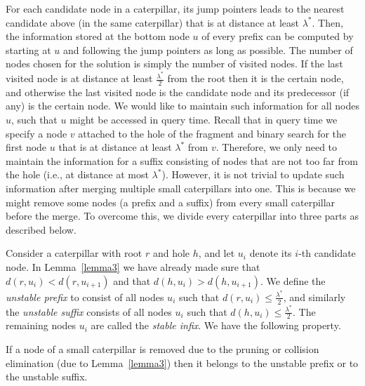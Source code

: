 \documentclass[a4paper,UKenglish]{lipics-v2016}
\theoremstyle{plain}
\begin{document}
\vspace{0.04in}  For each candidate node in a caterpillar, its jump pointers leads to the nearest
candidate above (in the same caterpillar) that is at distance at least $\lambda^{*}$. Then, the information
stored at the bottom node $u$ of every prefix can be computed by starting at $u$ and following
the jump pointers as long as possible. The number of nodes chosen for the solution is simply the number of visited
nodes. If the last visited node is at distance at least $\frac{\lambda^{*}}{2}$ from the root then it is
the certain node, and otherwise the last visited node is the candidate node and its predecessor
(if any) is the certain node. We would like to maintain such information for all nodes $u$,
such that $u$ might be accessed in query time. Recall that in query time we specify
a node $v$ attached to the hole of the fragment and binary search for the first node $u$ that
is at distance at least $\lambda^{*}$ from $v$. Therefore, we only need to maintain the information
for a suffix consisting of nodes that are not too far from the hole (i.e., at distance at most $\lambda^{*}$). However, it is not
 trivial to update such information after merging multiple small caterpillars into
one. This is because we might remove some nodes (a prefix and a suffix)
from every small caterpillar before the merge. To overcome this, we divide every caterpillar into
three parts as described below.

\vspace{0.04in}  
Consider a caterpillar with root $r$ and hole $h$, and let $u_{i}$ denote its $i$-th candidate node. In Lemma~\ref{lemma3} we have already made sure that $d(r,u_{i}) < d(r,u_{i+1})$
and that $d(h,u_{i}) > d(h,u_{i+1})$. We define the \emph{unstable prefix} to
consist of all nodes $u_{i}$ such that $d(r,u_{i})\leq \frac{\lambda^{*}}{2}$, and similarly the
\emph{unstable suffix} consists of all nodes $u_{i}$ such that $d(h,u_{i})\leq \frac{\lambda^{*}}{2}$.
The remaining nodes $u_{i}$ are called the \emph{stable infix}.  We have the following property.

\begin{lemma}
\label{stable infix}
If a node of a small caterpillar is removed due to the pruning or collision elimination (due to Lemma~\ref{lemma3}) then it
belongs to the unstable prefix or to the unstable suffix.
\end{lemma}
\end{document}
